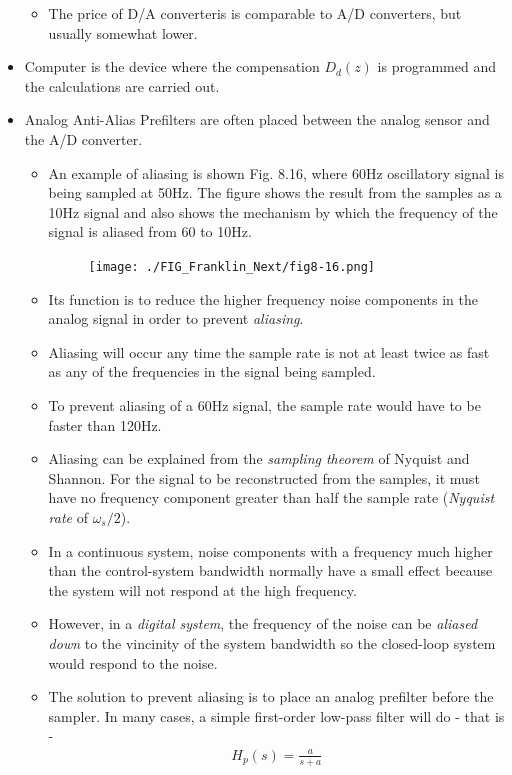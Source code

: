 \documentclass[landscape,14pt]{oblivoir}
\begin{document}
\begin{itemize}
\begin{itemize}
		\item The price of D/A converteris is comparable to A/D converters, but usually somewhat lower. 
	\end{itemize}
	\item Computer is the device where the compensation $D_d(z)$ is programmed and the calculations are carried out. 
%
\newpage
%
	\item Analog Anti-Alias Prefilters are often placed between the analog sensor and the A/D converter. 
	\begin{itemize}
		\item An example of aliasing is shown Fig. 8.16, where 60Hz oscillatory signal is being sampled at 50Hz. The figure shows the result from the samples as a 10Hz signal and also shows the mechanism by which the frequency of the signal is aliased from 60 to 10Hz. 
		\begin{figure}[h]
			\texttt{[image: ./FIG\_Franklin\_Next/fig8-16.png]}
		\end{figure}
		\item Its function is to reduce the higher frequency noise components in the analog signal in order to prevent \emph{aliasing}.
		\item Aliasing will occur any time the sample rate is not at least twice as fast as any of the frequencies in the signal being sampled. 
		\item To prevent aliasing of a 60Hz signal, the sample rate would have to be faster than 120Hz. 
%
\newpage
%
		\item Aliasing can be explained from the \emph{sampling theorem} of Nyquist and Shannon. For the signal to be reconstructed from the samples, it must have no frequency component greater than half the sample rate (\emph{Nyquist rate} of $\omega_s/2$).  
		\item In a continuous system, noise components with a frequency much higher than the control-system bandwidth normally have a small effect because the system will not respond at the high frequency. 
		\item However, in a \emph{digital system}, the frequency of the noise can be \emph{aliased down}  to the vincinity of the system bandwidth so the closed-loop system would respond to the noise.
		\item The solution to prevent aliasing is to place an analog prefilter before the sampler. In many cases, a simple first-order low-pass filter will do - that is - 
		\begin{align*}
			H_p(s) = \frac{a}{s+a}

\end{align*}
\end{itemize}
\end{itemize}
\end{document}

